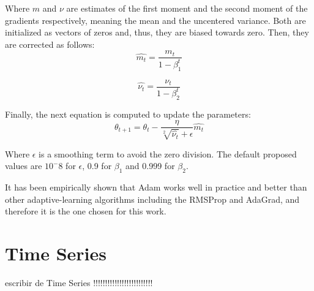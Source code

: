 Where $m$ and $\nu$ are estimates of the first moment and the second moment of the gradients respectively, meaning the mean and the uncentered variance. Both are initialized as vectors of zeros and, thus, they are biased towards zero. Then, they are corrected as follows:
\begin{equation}
\hat{m_t}=\frac{m_t}{1-\beta^t_1}
\end{equation}

\begin{equation}
\hat{\nu_t}=\frac{\nu_t}{1-\beta^t_2}
\end{equation}

Finally, the next equation is computed to update the parameters:
\begin{equation}
\theta_{t+1}=\theta_t-\frac{\eta}{\sqrt[2]{\hat{\nu_t}} + \epsilon} \hat{m_t} 
\end{equation}

Where $\epsilon$ is a smoothing term to avoid the zero division. The default proposed values are $10^-8$ for $\epsilon$, 0.9 for $\beta_1$ and 0.999 for $\beta_2$.


It has been empirically shown that Adam works well in practice and better than other adaptive-learning algorithms including the RMSProp and AdaGrad, and therefore it is the one chosen for this work.

\section{Time Series}
escribir de Time Series !!!!!!!!!!!!!!!!!!!!!!!!!
